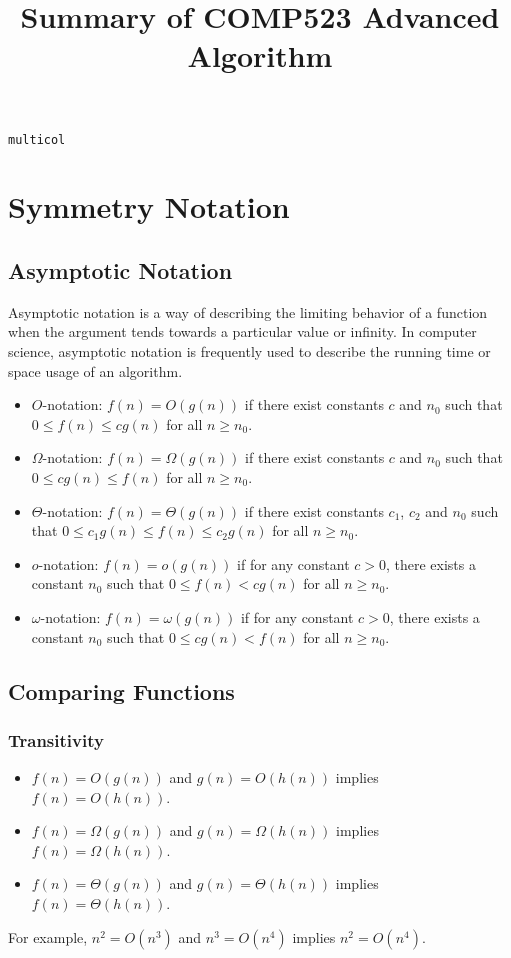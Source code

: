 \documentclass[onecolumn]{report}
\begin{document}
\texttt{multicol}
\title{Summary of COMP523 Advanced Algorithm}
\maketitle
\chapter{Symmetry Notation}
\section{Asymptotic Notation}
Asymptotic notation is a way of describing the limiting behavior of a function when the argument tends towards a particular value or infinity. In computer science, asymptotic notation is frequently used to describe the running time or space usage of an algorithm.\\
\begin{itemize}
\item $O$-notation: $f(n) = O(g(n))$ if there exist constants $c$ and $n_0$ such that $0 \leq f(n) \leq cg(n)$ for all $n \geq n_0$.
\item $\Omega$-notation: $f(n) = \Omega(g(n))$ if there exist constants $c$ and $n_0$ such that $0 \leq cg(n) \leq f(n)$ for all $n \geq n_0$.
\item $\Theta$-notation: $f(n) = \Theta(g(n))$ if there exist constants $c_1$, $c_2$ and $n_0$ such that $0 \leq c_1g(n) \leq f(n) \leq c_2g(n)$ for all $n \geq n_0$.
\item $o$-notation: $f(n) = o(g(n))$ if for any constant $c > 0$, there exists a constant $n_0$ such that $0 \leq f(n) < cg(n)$ for all $n \geq n_0$.
\item $\omega$-notation: $f(n) = \omega(g(n))$ if for any constant $c > 0$, there exists a constant $n_0$ such that $0 \leq cg(n) < f(n)$ for all $n \geq n_0$.
\end{itemize}

\section{Comparing Functions}
\subsection{Transitivity}
\begin{itemize}
\item $f(n) = O(g(n))$ and $g(n) = O(h(n))$ implies $f(n) = O(h(n))$.
\item $f(n) = \Omega(g(n))$ and $g(n) = \Omega(h(n))$ implies $f(n) = \Omega(h(n))$.
\item $f(n) = \Theta(g(n))$ and $g(n) = \Theta(h(n))$ implies $f(n) = \Theta(h(n))$.
\end{itemize}
For example, $n^2 = O(n^3)$ and $n^3 = O(n^4)$ implies $n^2 = O(n^4)$.
\end{document}
